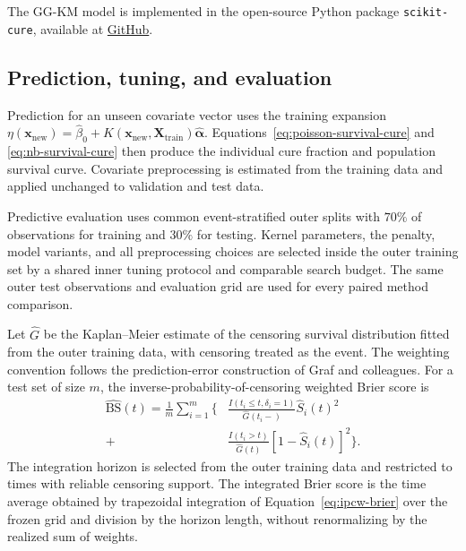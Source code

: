 The GG-KM model is implemented in the open-source Python package \texttt{scikit-cure},
available at \href{https://github.com/cowvin0/scikit-cure}{GitHub}.

\subsection{Prediction, tuning, and evaluation}
\label{sec:prediction-evaluation}

Prediction for an unseen covariate vector uses the training expansion
$
\eta(\bm{x}_{\mathrm{new}})
=
\widehat\beta_0
+
K(\bm{x}_{\mathrm{new}},\bm{X}_{\mathrm{train}})
\widehat{\bm{\alpha}}.
$
Equations~\eqref{eq:poisson-survival-cure} and
\eqref{eq:nb-survival-cure} then produce the individual cure fraction
and population survival curve. Covariate preprocessing is estimated
from the training data and applied unchanged to validation and test
data.

Predictive evaluation uses common event-stratified outer splits with
$70\%$ of observations for training and $30\%$ for testing. Kernel
parameters, the penalty, model variants, and all preprocessing choices
are selected inside the outer training set by a shared inner tuning
protocol and comparable search budget. The same outer test observations
and evaluation grid are used for every paired method comparison.

Let $\widehat G$ be the Kaplan--Meier estimate of the censoring survival
distribution fitted from the outer training data, with censoring treated
as the event. The weighting convention follows the prediction-error
construction of Graf and colleagues.\cite{graf1999} For a test set of
size $m$, the inverse-probability-of-censoring weighted Brier score is
\begin{equation}
	\begin{aligned}
		\widehat{\mathrm{BS}}(t)
		=
		\frac{1}{m}\sum_{i=1}^{m}
		\Biggl\{
		&\frac{I(t_i\leq t,\delta_i=1)}
		{\widehat G(t_i-)}
		\widehat S_i(t)^2\\
		+{}&
		\frac{I(t_i>t)}
		{\widehat G(t)}
		[1-\widehat S_i(t)]^2
		\Biggr\}.
	\end{aligned}
	\label{eq:ipcw-brier}
\end{equation}
The integration horizon is selected from the outer training data and
restricted to times with reliable censoring support. The integrated
Brier score is the time average obtained by trapezoidal integration of
Equation~\eqref{eq:ipcw-brier} over the frozen grid and division by the
horizon length, without renormalizing by the realized sum of weights.

